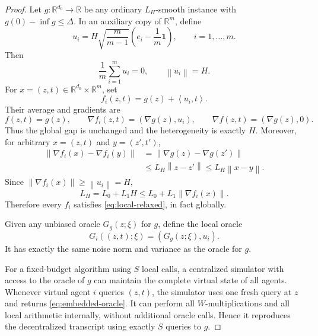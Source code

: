 \documentclass[11pt,a4paper]{article}
\newcommand{\R}{\mathbb{R}}
\newcommand{\norm}[1]{\left\lVert #1\right\rVert}
\newcommand{\inner}[2]{\left\langle #1,#2\right\rangle}
\newcommand{\one}{\mathbf{1}}
\theoremstyle{remark}
\begin{document}
\begin{proof}
Let $g:\R^{d_0}\to\R$ be any ordinary $L_H$-smooth instance with
$g(0)-\inf g\le\Delta$.  In an auxiliary copy of $\R^m$, define
\begin{equation}
 u_i=H\sqrt{\frac{m}{m-1}}
 \left(e_i-\frac1m\one\right),
 \qquad i=1,\ldots,m.
 \label{eq:simplex}
\end{equation}
Then
\[
 \frac1m\sum_{i=1}^m u_i=0,
 \qquad
 \norm{u_i}=H.
\]
For $x=(z,t)\in\R^{d_0}\times\R^m$, set
\begin{equation}
 f_i(z,t)=g(z)+\inner{u_i}{t}.
 \label{eq:embedded-local}
\end{equation}
Their average and gradients are
\begin{equation}
 f(z,t)=g(z),
 \qquad
 \nabla f_i(z,t)=(\nabla g(z),u_i),
 \qquad
 \nabla f(z,t)=(\nabla g(z),0).
 \label{eq:embedded-gradients}
\end{equation}
Thus the global gap is unchanged and the heterogeneity is exactly $H$.
Moreover, for arbitrary $x=(z,t)$ and $y=(z',t')$,
\[
\begin{aligned}
 \norm{\nabla f_i(x)-\nabla f_i(y)}
 &=\norm{\nabla g(z)-\nabla g(z')}\\
 &\le L_H\norm{z-z'}
 \le L_H\norm{x-y}.
\end{aligned}
\]
Since $\norm{\nabla f_i(x)}\ge\norm{u_i}=H$,
\[
 L_H=L_0+L_1H
 \le L_0+L_1\norm{\nabla f_i(x)}.
\]
Therefore every $f_i$ satisfies \eqref{eq:local-relaxed}, in fact globally.

Given any unbiased oracle $G_g(z;\xi)$ for $g$, define the local oracle
\begin{equation}
 G_i((z,t);\xi)=(G_g(z;\xi),u_i).
 \label{eq:embedded-oracle}
\end{equation}
It has exactly the same noise norm and variance as the oracle for $g$.

For a fixed-budget algorithm using $S$ local calls, a centralized
simulator with access to the oracle of $g$ can maintain the complete virtual
state of all agents.  Whenever virtual agent $i$ queries $(z,t)$, the simulator
uses one fresh query at $z$ and returns \eqref{eq:embedded-oracle}.  It can
perform all $W$-multiplications and all local arithmetic internally, without
additional oracle calls.  Hence it reproduces the decentralized transcript
using exactly $S$ queries to $g$.


\end{proof}
\end{document}
